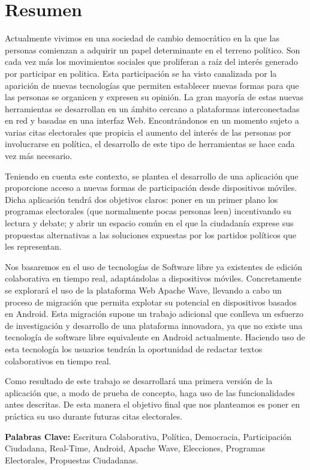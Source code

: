 \newpage
\renewcommand{\thepage}{\Roman{page}}
\setcounter{page}{10}
\chapter*{Resumen}
Actualmente vivimos en una sociedad de cambio democrático en la que las personas comienzan a adquirir un papel determinante en el terreno político. Son cada vez más los movimientos sociales que proliferan a raíz del interés generado por participar en politica. Esta participación se ha visto canalizada por la aparición de nuevas tecnologías que permiten establecer nuevas formas para que las personas se organicen y expresen su opinión. La gran mayoría de estas nuevas herramientas se desarrollan en un ámbito cercano a plataformas interconectadas en red y basadas en una interfaz Web. Encontrándonos en un momento sujeto a varias citas electorales que propicia el aumento del interés de las personas por involucrarse en política, el desarrollo de este tipo de herramientas se hace cada vez más necesario.

Teniendo en cuenta este contexto, se plantea el desarrollo de una aplicación que proporcione acceso a nuevas formas de participación desde dispositivos móviles. Dicha aplicación tendrá dos objetivos claros: poner en un primer plano los programas electorales (que normalmente pocas personas leen) incentivando su lectura y debate; y abrir un espacio común en el que la ciudadanía exprese sus propuestas alternativas a las soluciones expuestas por los partidos políticos que les representan.

Nos basaremos en el uso de tecnologías de Software libre ya existentes de edición colaborativa en tiempo real, adaptándolas a dispositivos móviles. Concretamente se explorará el uso de la plataforma Web Apache Wave, llevando a cabo un proceso de migración que permita explotar su potencial en dispositivos basados en Android. Esta migración supone un trabajo adicional que conlleva un esfuerzo de investigación y desarrollo de una plataforma innovadora, ya que no existe una tecnología de software libre equivalente en Android actualmente. Haciendo uso de esta tecnología los usuarios tendrán la oportunidad de redactar textos colaborativos en tiempo real.

Como resultado de este trabajo se desarrollará una primera versión de la aplicación que, a modo de prueba de concepto, haga uso de las funcionalidades antes descritas. De esta manera el objetivo final que nos planteamos es poner en práctica su uso durante futuras citas electorales.

\vfill
{\bf Palabras Clave:} {Escritura Colaborativa, Política, Democracia, Participación Ciudadana, Real-Time, Android, Apache Wave, Elecciones, Programas Electorales, Propuestas Ciudadanas.}

\newpage
\thispagestyle{empty}
\mbox{}

